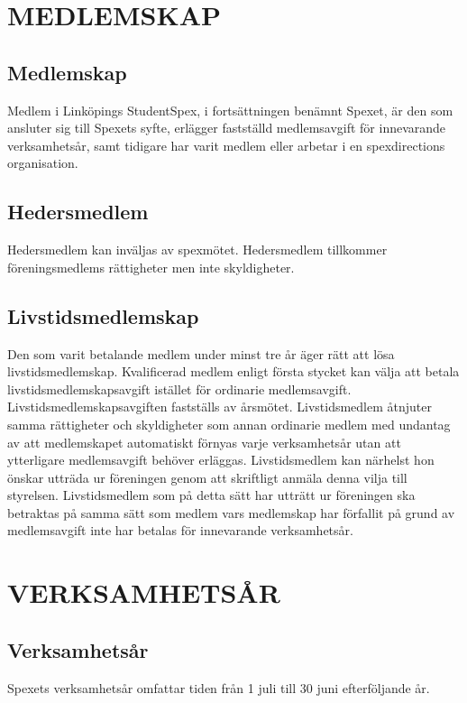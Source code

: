 \documentclass[a4paper]{article}
\begin{document}
\section{MEDLEMSKAP}
\subsection{Medlemskap}
Medlem i Linköpings StudentSpex, i fortsättningen benämnt Spexet, är den som ansluter sig till Spexets syfte, erlägger fastställd medlemsavgift för innevarande verksamhetsår, samt tidigare har varit medlem eller arbetar i en spexdirections organisation.

\subsection{Hedersmedlem}
Hedersmedlem kan inväljas av spexmötet. Hedersmedlem tillkommer föreningsmedlems rättigheter men inte skyldigheter.

\subsection{Livstidsmedlemskap}
Den som varit betalande medlem under minst tre år äger rätt att lösa livstidsmedlemskap. Kvalificerad medlem enligt första stycket kan välja att betala livstidsmedlemskapsavgift istället för ordinarie medlemsavgift. \newline
\newline
Livstidsmedlemskapsavgiften fastställs av årsmötet.\newline
\newline
Livstidsmedlem åtnjuter samma rättigheter och skyldigheter som annan ordinarie medlem med undantag av att medlemskapet automatiskt förnyas varje verksamhetsår utan att ytterligare medlemsavgift behöver erläggas.\newline
\newline
Livstidsmedlem kan närhelst hon önskar utträda ur föreningen genom att skriftligt anmäla denna vilja till styrelsen. Livstidsmedlem som på detta sätt har utträtt ur föreningen ska betraktas på samma sätt som medlem vars medlemskap har förfallit på grund av medlemsavgift inte har betalas för innevarande verksamhetsår.

\section{VERKSAMHETSÅR}
\subsection{Verksamhetsår}
Spexets verksamhetsår omfattar tiden från 1 juli till 30 juni efterföljande år.
\end{document}

